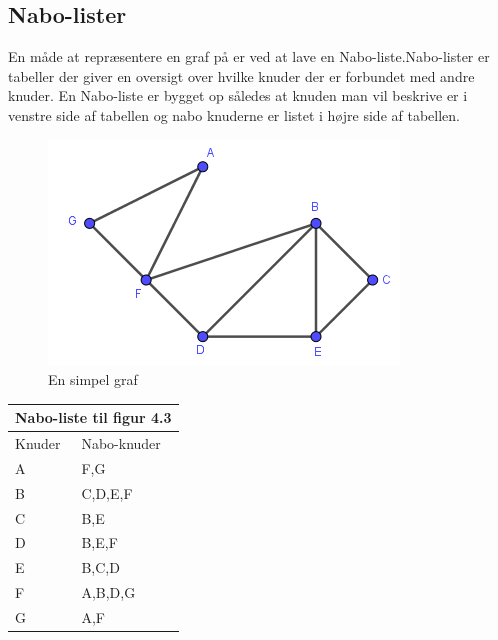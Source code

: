 \subsection{Nabo-lister}
En måde at repræsentere en graf på er ved at lave en Nabo-liste.Nabo-lister er tabeller der giver en oversigt over hvilke knuder der er forbundet med andre knuder. En Nabo-liste er bygget op således at knuden man vil beskrive er i venstre side af tabellen og nabo knuderne er listet i højre side af tabellen. 

\begin{exmp}
	\begin{figure}[H]
	\centering
	\includegraphics[scale=0.5]{fig/img/Nabolisteeks1}
	\caption{En simpel graf}
	\end{figure}
\begin{center}
	\begin{tabular}{ |p{4cm}||p{3cm}|}
	 	\hline
 		\multicolumn{2}{|c|}{Nabo-liste til figur 4.3} \\
 		\hline
 		Knuder & Nabo-knuder\\
 		\hline
 		A & F,G \\
		B & C,D,E,F \\
		C & B,E \\
		D & B,E,F \\
		E & B,C,D \\
		F & A,B,D,G \\
		G & A,F \\
 	\hline
	\end{tabular}
\end{center}
\end{exmp}